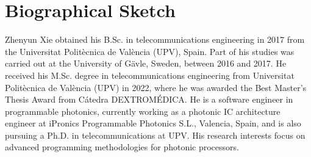 

\chapter*{Biographical Sketch}

Zhenyun Xie obtained his B.Sc. in telecommunications engineering in 2017 from the Universitat Politècnica de València (UPV), Spain.
Part of his studies was carried out at the University of Gävle, Sweden, between 2016 and 2017.
He received his M.Sc. degree in telecommunications engineering from Universitat Politècnica de València (UPV) in 2022, where he was awarded the Best Master’s Thesis Award from Cátedra DEXTROMÉDICA.
He is a software engineer in programmable photonics, currently working as a photonic IC architecture engineer at iPronics Programmable Photonics S.L., Valencia, Spain, and is also pursuing a Ph.D. in telecommunications at UPV.
His research interests focus on advanced programming methodologies for photonic processors.
